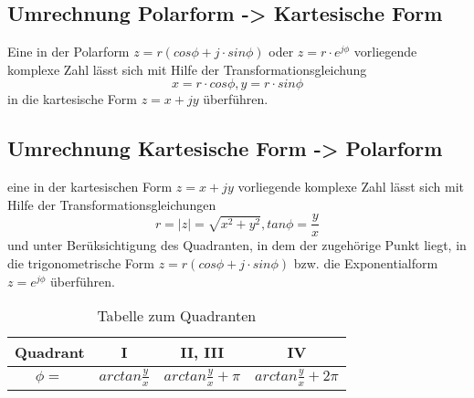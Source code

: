 \subsection{Umrechnung Polarform -> Kartesische Form}
Eine in der Polarform $z = r (cos\phi + j \cdot sin\phi)$ oder $z=r \cdot e^{j\phi}$ vorliegende komplexe Zahl lässt sich mit Hilfe der Transformationsgleichung 
$$ x = r \cdot cos\phi, y = r \cdot sin\phi$$ 
in die kartesische Form $z = x + jy$ überführen.

\subsection{Umrechnung Kartesische Form -> Polarform}
eine in der kartesischen Form $z = x + jy$ vorliegende komplexe Zahl lässt sich mit Hilfe der Transformationsgleichungen 
$$ r = |z| = \sqrt{x^2 + y^2}, tan \phi = \frac{y}{x}$$ 
und unter Berüksichtigung des Quadranten, in dem der zugehörige Punkt liegt, in die trigonometrische Form $z = r(cos\phi + j \cdot sin\phi)$ bzw. die Exponentialform $z=e^{j\phi}$ überführen.
\begin{table}[H]
\begin{tabular}{|c|c|c|c|}
\hline 
Quadrant & I & II, III & IV \\ 
\hline 
$\phi =$ & $arctan \frac{y}{x}$ & $arctan \frac{y}{x}+\pi$ & $arctan \frac{y}{x} + 2\pi$ \\ 
\hline 
\end{tabular}
\caption{Tabelle zum Quadranten}
\end{table} 